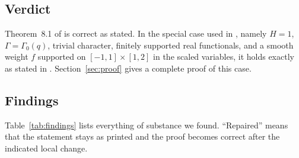 \documentclass[11pt]{amsart}
\theoremstyle{remark}
\theoremstyle{definition}
\numberwithin{equation}{section}
\begin{document}
\subsection*{Verdict}
Theorem~8.1 of \cite{GM1} is correct as stated. In the special case used in \cite{II}, namely $H=1$, $\Gamma=\Gamma_0(q)$, trivial character, finitely supported real functionals, and a smooth weight $f$ supported on $[-1,1]\times[1,2]$ in the scaled variables, it holds exactly as stated in \cite[Theorem~6.1]{II}. Section~\ref{sec:proof} gives a complete proof of this case.

\subsection*{Findings}
Table~\ref{tab:findings} lists everything of substance we found. ``Repaired'' means that the statement stays as printed and the proof becomes correct after the indicated local change.
\end{document}
